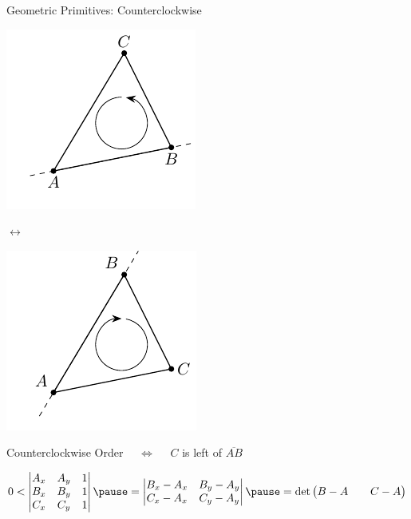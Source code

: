 \documentclass[aspectratio=169,fleqn]{beamer}
\begin{document}
  \begin{frame}{Geometric Primitives: Counterclockwise}
    \begin{minipage}[c]{0.4\textwidth}
        \centering
        \includegraphics{figures/triangle-counterclockwise.pdf}
    \end{minipage}
    \hfill
    $\longleftrightarrow$
    \hfill
    \begin{minipage}[c]{0.4\textwidth}
        \centering
        \includegraphics{figures/triangle-clockwise.pdf}
    \end{minipage}

    Counterclockwise Order
    \pause
    $\quad\iff\quad$ $C$ is left of $\overline{AB}$

    \bigskip

    \pause
    \begin{mybox}
    \[
      0 <
      \begin{vmatrix}
        A_x & A_y & 1 \\
        B_x & B_y & 1 \\
        C_x & C_y & 1 \\
      \end{vmatrix}
      \pause
      =
      \begin{vmatrix}
        B_x - A_x & B_y - A_y \\
        C_x - A_x & C_y - A_y \\
      \end{vmatrix}
      \pause
      =
      \det
      \begin{pmatrix}
        B-A && C-A
      \end{pmatrix}
    \]
    \end{mybox}
  \end{frame}
\end{document}
